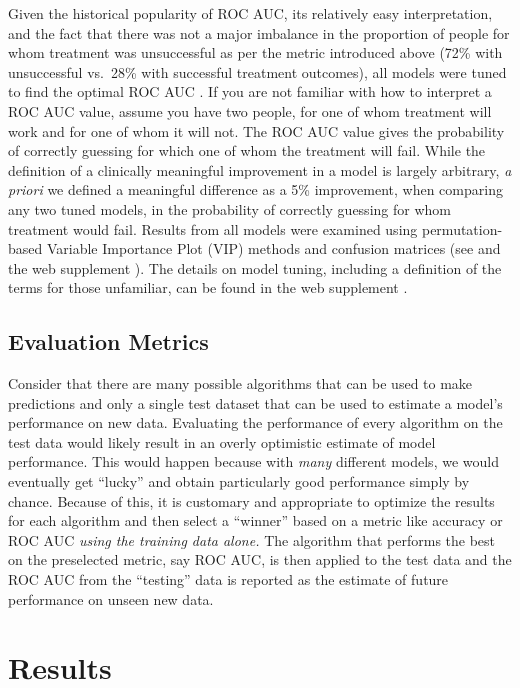\documentclass[
  number,
  preprint,
  3p,
  onecolumn]{elsarticle}
\begin{document}
Given the historical popularity of ROC AUC, its relatively easy
interpretation, and the fact that there was not a major imbalance in the
proportion of people for whom treatment was unsuccessful as per the
metric introduced above (72\% with unsuccessful vs.~28\% with successful
treatment outcomes), all models were tuned to find the optimal ROC AUC
\citep{weiss2013}. If you are not familiar with how to interpret a ROC
AUC value, assume you have two people, for one of whom treatment will
work and for one of whom it will not. The ROC AUC value gives the
probability of correctly guessing for which one of whom the treatment
will fail. While the definition of a clinically meaningful improvement
in a model is largely arbitrary, \emph{a priori} we defined a meaningful
difference as a 5\% improvement, when comparing any two tuned models, in
the probability of correctly guessing for whom treatment would fail.
Results from all models were examined using permutation-based Variable
Importance Plot (VIP) methods and confusion matrices (see
\citep{molnar2022b} and the web supplement
\citep{balise_supplement_2025}). The details on model tuning, including
a definition of the terms for those unfamiliar, can be found in the web
supplement \citep{balise_supplement_2025}.

\subsection{Evaluation Metrics}\label{evaluation-metrics}

Consider that there are many possible algorithms that can be used to
make predictions and only a single test dataset that can be used to
estimate a model's performance on new data. Evaluating the performance
of every algorithm on the test data would likely result in an overly
optimistic estimate of model performance. This would happen because with
\emph{many} different models, we would eventually get ``lucky'' and
obtain particularly good performance simply by chance. Because of this,
it is customary and appropriate to optimize the results for each
algorithm and then select a ``winner'' based on a metric like accuracy
or ROC AUC \emph{using the training data alone.} The algorithm that
performs the best on the preselected metric, say ROC AUC, is then
applied to the test data and the ROC AUC from the ``testing'' data is
reported as the estimate of future performance on unseen new data.

\section{Results}\label{results-1}
\end{document}
